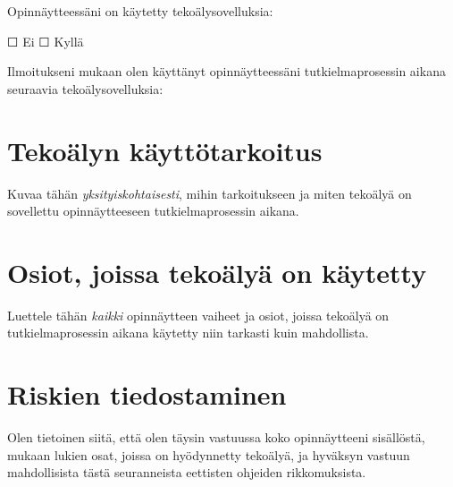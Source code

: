 Opinnäytteessäni on käytetty tekoälysovelluksia:

☐  Ei
☐  Kyllä

Ilmoitukseni mukaan olen käyttänyt opinnäytteessäni tutkielmaprosessin aikana
seuraavia tekoälysovelluksia:

\begin{center}
\end{center}

\section*{Tekoälyn käyttötarkoitus}

Kuvaa tähän \emph{yksityiskohtaisesti}, mihin tarkoitukseen ja miten tekoälyä
on sovellettu opinnäytteeseen tutkielmaprosessin aikana.

\section*{Osiot, joissa tekoälyä on käytetty}

Luettele tähän \emph{kaikki} opinnäytteen vaiheet ja osiot, joissa tekoälyä on
tutkielmaprosessin aikana käytetty niin tarkasti kuin mahdollista.

\section*{Riskien tiedostaminen}

Olen tietoinen siitä, että olen täysin vastuussa koko opinnäytteeni sisällöstä,
mukaan lukien osat, joissa on hyödynnetty tekoälyä, ja hyväksyn vastuun
mahdollisista tästä seuranneista eettisten ohjeiden rikkomuksista.
